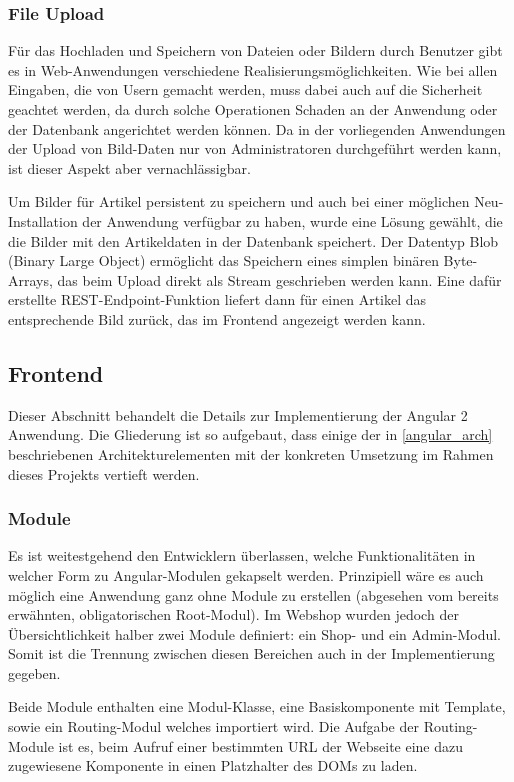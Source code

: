 \subsubsection{File Upload}
Für das Hochladen und Speichern von Dateien oder Bildern durch Benutzer gibt es in Web-Anwendungen verschiedene Realisierungsmöglichkeiten.
Wie bei allen Eingaben, die von Usern gemacht werden, muss dabei auch auf die Sicherheit geachtet werden, da durch solche Operationen Schaden an der Anwendung oder der Datenbank angerichtet werden können.
Da in der vorliegenden Anwendungen der Upload von Bild-Daten nur von Administratoren durchgeführt werden kann, ist dieser Aspekt aber vernachlässigbar.

Um Bilder für Artikel persistent zu speichern und auch bei einer möglichen Neu-Installation der Anwendung verfügbar zu haben, wurde eine Lösung gewählt, die die Bilder mit den Artikeldaten in der Datenbank speichert.
Der Datentyp \acs{Blob} (Binary Large Object) ermöglicht das Speichern eines simplen binären Byte-Arrays, das beim Upload direkt als Stream geschrieben werden kann.
Eine dafür erstellte REST-Endpoint-Funktion liefert dann für einen Artikel das entsprechende Bild zurück, das im Frontend angezeigt werden kann.
\subsection{Frontend}
Dieser Abschnitt behandelt die Details zur Implementierung der Angular 2 Anwendung. Die Gliederung ist so aufgebaut, dass einige der in \cref{angular_arch} beschriebenen   Architekturelementen mit der konkreten Umsetzung im Rahmen dieses Projekts vertieft werden.

\subsubsection{Module}
Es ist weitestgehend den Entwicklern überlassen, welche Funktionalitäten in welcher Form zu Angular-Modulen gekapselt werden. Prinzipiell wäre es auch möglich eine Anwendung ganz ohne Module zu erstellen (abgesehen vom bereits erwähnten, obligatorischen Root-Modul). Im Webshop wurden jedoch der Übersichtlichkeit halber zwei Module definiert: ein Shop- und ein Admin-Modul. Somit ist die Trennung zwischen diesen Bereichen auch in der Implementierung gegeben.

Beide Module enthalten eine Modul-Klasse, eine Basiskomponente mit Template, sowie ein Routing-Modul welches importiert wird. Die Aufgabe der Routing-Module ist es, beim Aufruf einer bestimmten URL der Webseite eine dazu zugewiesene Komponente in einen Platzhalter des \acs{DOM}s zu laden.
\\


